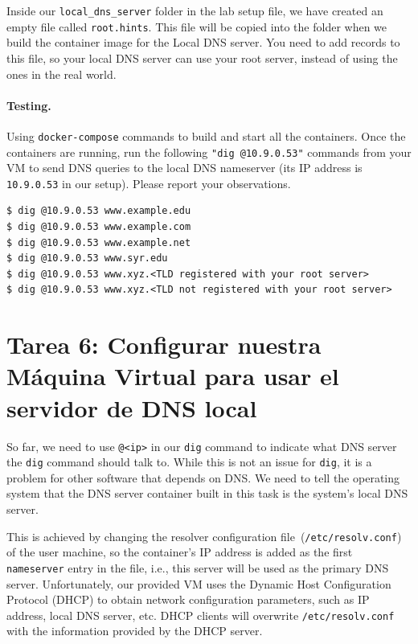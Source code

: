 Inside our \texttt{local\_dns\_server} folder in the lab setup file,
we have created an empty file called \texttt{root.hints}. This file 
will be copied into the  folder when
we build the container image for the Local DNS server. 
You need to add records to this file, so your local DNS server 
can use your root server, instead of using the ones in the real world.



\paragraph{Testing.} Using \texttt{docker-compose} commands
to build and start all the containers.
Once the containers are running,
run the following \texttt{"dig @10.9.0.53"} commands from your VM to
send DNS queries to the local DNS nameserver (its IP address
is \texttt{10.9.0.53} in our setup). 
Please report your observations.

\begin{lstlisting}
$ dig @10.9.0.53 www.example.edu
$ dig @10.9.0.53 www.example.com
$ dig @10.9.0.53 www.example.net
$ dig @10.9.0.53 www.syr.edu
$ dig @10.9.0.53 www.xyz.<TLD registered with your root server>
$ dig @10.9.0.53 www.xyz.<TLD not registered with your root server>
\end{lstlisting}



\section{Tarea 6: Configurar nuestra Máquina Virtual para usar el servidor de DNS local} 

So far, we need to use \texttt{@<ip>} in our \texttt{dig} command
to indicate what DNS server the \texttt{dig} command should talk to. While this 
is not an issue for \texttt{dig}, it is a problem for other software that 
depends on DNS. We need to tell the operating system that the 
DNS server container built in this task is the system's 
local DNS server. 

This is achieved by changing
the resolver configuration file~(\texttt{/etc/resolv.conf}) of the user machine,
so the container's IP address is added as the first \texttt{nameserver} entry in the file, i.e.,
this server will be used as the primary DNS server.
Unfortunately, our provided VM uses the Dynamic Host Configuration Protocol (DHCP) to obtain
network configuration parameters, such as IP address, local DNS server, etc.
DHCP clients will overwrite \texttt{/etc/resolv.conf} with the information
provided by the DHCP server.

